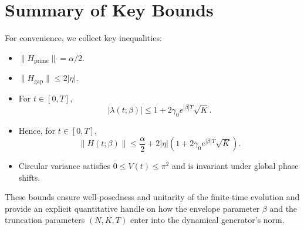 \documentclass[11pt]{article}
\begin{document}
\section{Summary of Key Bounds}

For convenience, we collect key inequalities:

\begin{itemize}
  \item $\|H_{\mathrm{prime}}\| = \alpha/2$.
  \item $\|H_{\mathrm{gap}}\|\le 2|\eta|$.
  \item For $t\in[0,T]$,
  \[
  |\lambda(t;\beta)|\le 1 + 2\gamma_0 e^{|\beta| T}\sqrt{K}.
  \]
  \item Hence, for $t\in[0,T]$,
  \[
  \|H(t;\beta)\|\le \frac{\alpha}{2} + 2|\eta|\left(1+2\gamma_0 e^{|\beta| T}\sqrt{K}\right).
  \]
  \item Circular variance satisfies $0\le V(t)\le \pi^2$ and is invariant under global phase shifts.
\end{itemize}

These bounds ensure well-posedness and unitarity of the finite-time evolution and provide an explicit quantitative handle on how the envelope parameter $\beta$ and the truncation parameters $(N,K,T)$ enter into the dynamical generator’s norm.

\nocite{*}
  
  
\end{document}
